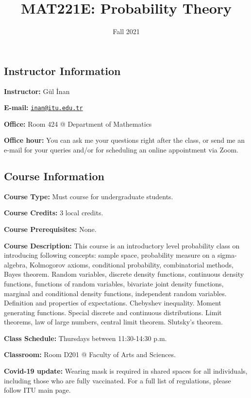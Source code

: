 \documentclass[
  12pt,
]{article}
\title{MAT221E: Probability Theory}
\author{}
\date{\vspace{-2.5em}Fall 2021}
\begin{document}
\maketitle

\hypertarget{instructor-information}{%
\subsection{Instructor Information}\label{instructor-information}}

\textbf{Instructor:} Gül İnan

\textbf{E-mail:}
\href{mailto:inan@itu.edu.tr}{\nolinkurl{inan@itu.edu.tr}}

\textbf{Office:} Room 424 @ Department of Mathematics

\textbf{Office hour:} You can ask me your questions right after the
class, or send me an e-mail for your queries and/or for scheduling an
online appointment via Zoom.

\hypertarget{course-information}{%
\subsection{Course Information}\label{course-information}}

\textbf{Course Type:} Must course for undergraduate students.

\textbf{Course Credits:} 3 local credits.

\textbf{Course Prerequisites:} None.

\textbf{Course Description:} This course is an introductory level
probability class on introducing following concepts: sample space,
probability measure on a sigma-algebra, Kolmogorov axioms, conditional
probability, combinatorial methods, Bayes theorem. Random variables,
discrete density functions, continuous density functions, functions of
random variables, bivariate joint density functions, marginal and
conditional density functions, independent random variables. Definition
and properties of expectations. Chebyshev inequality. Moment generating
functions. Special discrete and continuous distributions. Limit
theorems, law of large numbers, central limit theorem. Slutsky's
theorem.

\textbf{Class Schedule:} Thursdays between 11:30-14:30 p.m.

\textbf{Classroom:} Room D201 @ Faculty of Arts and Sciences.

\textbf{Covid-19 update:} Wearing mask is required in shared spaces for
all individuals, including those who are fully vaccinated. For a full
list of regulations, please follow ITU main page.
\end{document}
